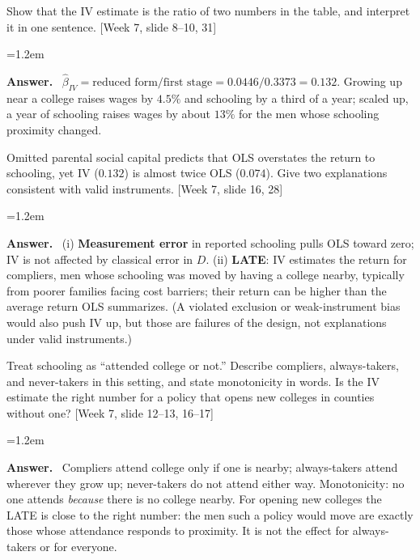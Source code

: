 \documentclass[11pt]{article}
\newenvironment{answer}{\par\smallskip
  \begin{list}{}{\leftmargin=1.2em\rightmargin=0pt}\item[]\color{dukeblue}%
  \textbf{Answer.}\ }{\end{list}\smallskip}
\newcommand{\slideref}[2]{{\footnotesize\color{gray}[Week #1, slide #2]}}
\begin{document}
\begin{enumerate}[label=(\alph*),leftmargin=*,itemsep=6pt]
\item Show that the IV estimate is the ratio of two numbers in the table, and interpret it
      in one sentence. \slideref{7}{8--10, 31}
\begin{answer}
$\hat\beta_{IV} = \text{reduced form}/\text{first stage} = 0.0446/0.3373 = 0.132$. Growing up
near a college raises wages by $4.5\%$ and schooling by a third of a year; scaled up, a year
of schooling raises wages by about $13\%$ for the men whose schooling proximity changed.
\end{answer}

\item Omitted parental social capital predicts that OLS overstates the return to schooling,
      yet IV ($0.132$) is almost twice OLS ($0.074$). Give two explanations consistent with
      valid instruments.
      \slideref{7}{16, 28}
\begin{answer}
(i) \textbf{Measurement error} in reported schooling pulls OLS toward zero; IV is not
affected by classical error in $D$. (ii) \textbf{LATE}: IV estimates the return for compliers,
men whose schooling was moved by having a college nearby, typically from poorer families
facing cost barriers; their return can be higher than the average return OLS summarizes.
(A violated exclusion or weak-instrument bias would also push IV up, but those are failures
of the design, not explanations under valid instruments.)
\end{answer}

\item Treat schooling as ``attended college or not.'' Describe compliers, always-takers, and
      never-takers in this setting, and state monotonicity in words. Is the IV estimate the
      right number for a policy that opens new colleges in counties without one?
      \slideref{7}{12--13, 16--17}
\begin{answer}
Compliers attend college only if one is nearby; always-takers attend wherever they grow up;
never-takers do not attend either way. Monotonicity: no one attends \emph{because} there is
no college nearby. For opening new colleges the LATE is close to the right number: the men
such a policy would move are exactly those whose attendance responds to proximity. It is not
the effect for always-takers or for everyone.
\end{answer}
\end{enumerate}

\newpage
\end{document}
